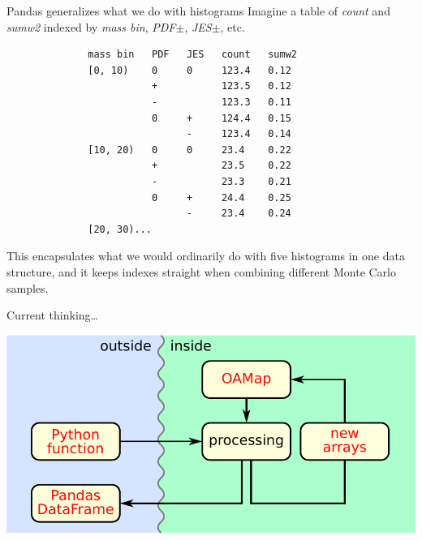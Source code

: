 \documentclass[aspectratio=169]{beamer}
\begin{document}
\begin{frame}[fragile]{Pandas generalizes what we do with histograms}
\vspace{0.35 cm}
Imagine a table of {\it count} and {\it sumw2} indexed by {\it mass bin}, {\it PDF$\pm$}, {\it JES$\pm$}, etc.

{\small\begin{verbatim}
              mass bin   PDF   JES   count   sumw2
              [0, 10)    0     0     123.4   0.12
                         +           123.5   0.12
                         -           123.3   0.11
                         0     +     124.4   0.15
                               -     123.4   0.14
              [10, 20)   0     0     23.4    0.22
                         +           23.5    0.22
                         -           23.3    0.21
                         0     +     24.4    0.25
                               -     23.4    0.24
              [20, 30)...
\end{verbatim}}

This encapsulates what we would ordinarily do with five histograms in one data structure, and it keeps indexes straight when combining different Monte Carlo samples.
\end{frame}

\begin{frame}{Current thinking\ldots}
\vspace{0.5 cm}
\begin{center}
\includegraphics[width=0.7\linewidth]{block-diagram-output.pdf}
\end{center}
\end{frame}
\end{document}
